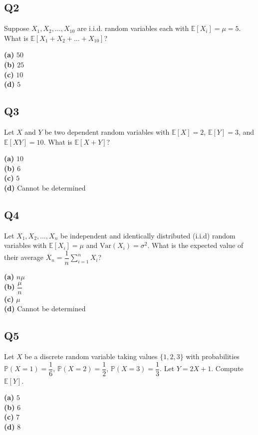 \subsection*{Q2}
Suppose $X_1, X_2, \dots, X_{10}$ are i.i.d. random variables each with $\mathbb{E}[X_i] = \mu = 5$. What is $\mathbb{E}[X_1 + X_2 + \dots + X_{10}]$?

\textbf{(a)} $50$  \\
\textbf{(b)} $25$  \\
\textbf{(c)} $10$  \\
\textbf{(d)} $5$

\subsection*{Q3}
Let $X$ and $Y$ be two dependent random variables with $\mathbb{E}[X] = 2$, $\mathbb{E}[Y] = 3$, and $\mathbb{E}[XY] = 10$. What is $\mathbb{E}[X + Y]$?

\textbf{(a)} $10$  \\
\textbf{(b)} $6$  \\
\textbf{(c)} $5$  \\
\textbf{(d)} Cannot be determined

\subsection*{Q4}
Let $X_1, X_2, \dots, X_n$ be independent and identically distributed (i.i.d) random variables with $\mathbb{E}[X_i] = \mu$ and $\text{Var}(X_i) = \sigma^2$. What is the expected value of their average $\overline{X}_n = \dfrac{1}{n} \sum_{i=1}^n X_i$?

\textbf{(a)} $n\mu$  \\
\textbf{(b)} $\dfrac{\mu}{n}$  \\
\textbf{(c)} $\mu$  \\
\textbf{(d)} Cannot be determined

\subsection*{Q5}
Let $X$ be a discrete random variable taking values $\{1, 2, 3\}$ with probabilities $\mathbb{P}(X=1) = \dfrac{1}{6}$, $\mathbb{P}(X=2) = \dfrac{1}{2}$, $\mathbb{P}(X=3) = \dfrac{1}{3}$. Let $Y = 2X + 1$. Compute $\mathbb{E}[Y]$.

\textbf{(a)} $5$  \\
\textbf{(b)} $6$  \\
\textbf{(c)} $7$  \\
\textbf{(d)} $8$

